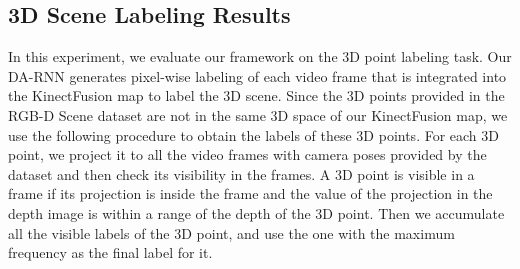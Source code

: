 \documentclass[conference]{IEEEtran}
\begin{document}
\begin{table} 
	\vspace{-6mm}
\end{table}

\subsection{3D Scene Labeling Results}

In this experiment, we evaluate our framework on the 3D point labeling task. Our DA-RNN generates pixel-wise labeling of each video frame that is integrated into the KinectFusion map to label the 3D scene. Since the 3D points provided in the RGB-D Scene dataset are not in the same 3D space of our KinectFusion map, we use the following procedure to obtain the labels of these 3D points. For each 3D point, we project it to all the video frames with camera poses provided by the dataset and then check its visibility in the frames. A 3D point is visible in a frame if its projection is inside the frame and the value of the projection in the depth image is within a range of the depth of the 3D point. Then we accumulate all the visible labels of the 3D point, and use the one with the maximum frequency as the final label for it.
\end{document}
